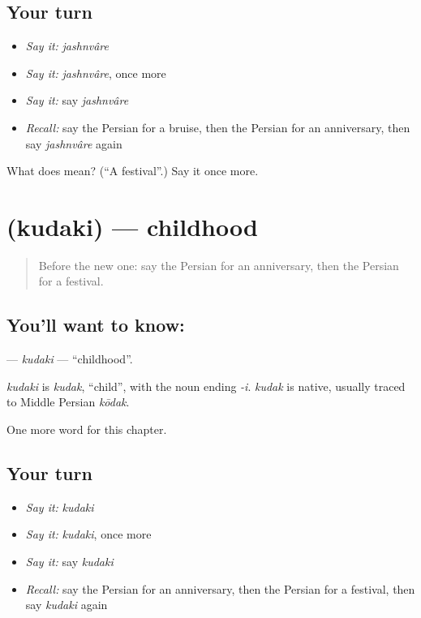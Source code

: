 \subsection*{Your turn}
\begin{itemize}
\raggedright
  \item \emph{Say it:} \emph{jashnvâre}
  \item \emph{Say it:} \emph{jashnvâre}, once more
  \item \emph{Say it:} say \emph{jashnvâre}
  \item \emph{Recall:} say the Persian for a bruise, then the Persian for an anniversary, then say \emph{jashnvâre} again
\end{itemize}

\begin{tcolorbox}[breakable,colback=teal!4,colframe=teal!35!black,title={Before you move on}]
What does  mean? (\textquotedblleft{}A festival\textquotedblright{}.) Say it once more.
\end{tcolorbox}
\section[\texorpdfstring{\fa{کودکی} (kudaki)}{کودکی (kudaki)}]{ (kudaki) — childhood}

\label{lesson:FA-C264-kudaki}



\begin{quote}
Before the new one: say the Persian for an anniversary, then the Persian for a festival.
\end{quote}

\subsection*{You'll want to know: }
\textbf{} — \emph{kudaki} — \textquotedblleft{}childhood\textquotedblright{}.

\begin{cousinweb}
\emph{kudaki} is \emph{kudak}, \textquotedblleft{}child\textquotedblright{}, with the noun ending \emph{-i}. \emph{kudak} is native, usually traced to Middle Persian \emph{kōdak}.
\end{cousinweb}

\begin{grammarlens}[title={What you've built}]
One more word for this chapter.
\end{grammarlens}

\subsection*{Your turn}
\begin{itemize}
\raggedright
  \item \emph{Say it:} \emph{kudaki}
  \item \emph{Say it:} \emph{kudaki}, once more
  \item \emph{Say it:} say \emph{kudaki}
  \item \emph{Recall:} say the Persian for an anniversary, then the Persian for a festival, then say \emph{kudaki} again
\end{itemize}


